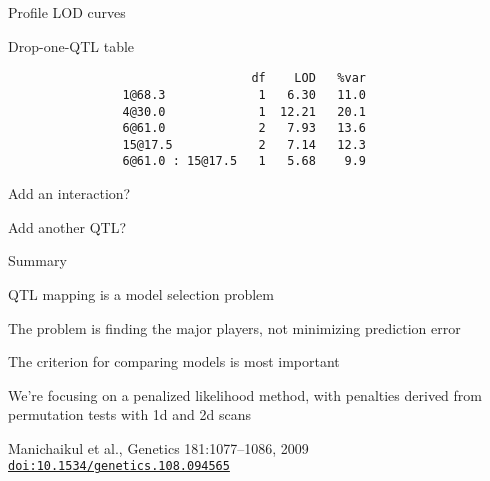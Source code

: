 \documentclass[aspectratio=169,12pt,t]{beamer}
\begin{document}
\begin{frame}{Profile LOD curves}


\note{
}
\end{frame}




\begin{frame}[fragile,c]{Drop-one-QTL table}

\begin{verbatim}
                                  df    LOD   %var
                1@68.3             1   6.30   11.0
                4@30.0             1  12.21   20.1
                6@61.0             2   7.93   13.6
                15@17.5            2   7.14   12.3
                6@61.0 : 15@17.5   1   5.68    9.9
\end{verbatim}

\note{
}
\end{frame}




\begin{frame}[c]{Add an interaction?}


\note{
}
\end{frame}



\begin{frame}[c]{Add another QTL?}


\note{
}
\end{frame}







\begin{frame}{Summary}


\bbi
\item QTL mapping is a model selection problem
\item The problem is finding the major players, not minimizing
  prediction error
\item The criterion for comparing models is most important
\item We're focusing on a penalized likelihood method, with penalties
  derived from permutation tests with 1d and 2d scans
\item Manichaikul et al., Genetics 181:1077--1086, 2009 \\
  \href{https://doi.org/10.1534/genetics.108.094565}{\tt doi:10.1534/genetics.108.094565}
\ei

\note{
}
\end{frame}
\end{document}
